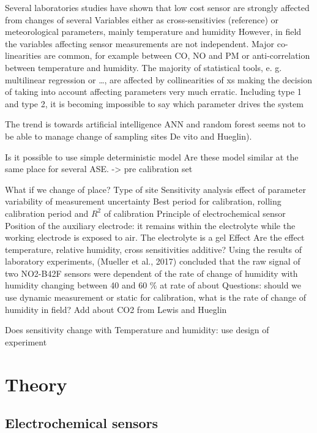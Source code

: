 \documentclass[sensors,article,submit,moreauthors,pdftex]{mdpi}
\begin{document}
Several laboratories studies have shown that low cost sensor are
strongly affected from changes of several Variables either as
cross-sensitivies (reference) or meteorological parameters, mainly
temperature and humidity However, in field the variables affecting
sensor measurements are not independent. Major co-linearities are
common, for example between CO, NO and PM or anti-correlation between
temperature and humidity. The majority of statistical tools, e. g.
multilinear regression or \ldots{}, are affected by collinearities of xs
making the decision of taking into account affecting parameters very
much erratic. Including type 1 and type 2, it is becoming impossible to
say which parameter drives the system

The trend is towards artificial intelligence ANN and random forest seems
not to be able to manage change of sampling sites De vito and Hueglin).

Is it possible to use simple deterministic model Are these model similar
at the same place for several ASE. -\textgreater{} pre calibration set

What if we change of place? Type of site Sensitivity analysis effect of
parameter variability of measurement uncertainty Best period for
calibration, rolling calibration period and \(R^2\) of calibration
Principle of electrochemical sensor Position of the auxiliary electrode:
it remains within the electrolyte while the working electrode is exposed
to air. The electrolyte is a gel Effect Are the effect temperature,
relative humidity, cross sensitivities additive? Using the results of
laboratory experiments, (Mueller et al., 2017) concluded that the raw
signal of two NO2-B42F sensors were dependent of the rate of change of
humidity with humidity changing between 40 and 60 \% at rate of about
Questions: should we use dynamic measurement or static for calibration,
what is the rate of change of humidity in field? Add about CO2 from
Lewis and Hueglin

Does sensitivity change with Temperature and humidity: use design of
experiment

\section{Theory}\label{theory}

\subsection{Electrochemical sensors}\label{electrochemical-sensors}
\end{document}
